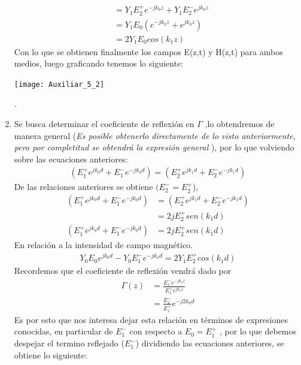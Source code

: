 \documentclass[
  11pt,
  letterpaper,
   addpoints,
   answers
  ]{exam}
\begin{document}
\begin{questions}
\begin{solution}
\begin{enumerate}
\begin{align}
                &= Y_{1}E_{2}^{+}e^{-jk_{0}z} + Y_{1}E_{2}^{-}e^{jk_{0}z}\\
                &= Y_{1}E_{0}(e^{-jk_{0}z} + e^{jk_{0}z} )\\
                &=2Y_{1}E_{0}cos(k_{1}z)
            \end{align}
            Con lo que se obtienen finalmente los campos E(z,t) y H(z,t) para ambos medios, luego graficando tenemos lo siguiente:
            \begin{center}
                \texttt{[image: Auxiliar\_5\_2]}
                \label{fig:mesh25}
            \end{center}.
            \item Se busca determinar el coeficiente de reflexión en $\Gamma$ ,lo obtendremos de manera general (\textit{Es posible obtenerlo directamente de lo visto anteriormente, pero por completitud se obtendrá la expresión general }), por lo que volviendo sobre las ecuaciones anteriores:
            \begin{align}
                ( E_{1}^{+}e^{jk_{0}d} +E_{1}^{-}e^{-jk_{0}d})=( E_{2}^{+}e^{jk_{1}d} +E_{2}^{-}e^{-jk_{1}d})
            \end{align}
            De las relaciones anteriores se obtiene $(E_{2}^{-} = E_{2}^{+}$),
            \begin{align}
                ( E_{1}^{+}e^{jk_{0}d} +E_{1}^{-}e^{-jk_{0}d})&=( E_{2}^{+}e^{jk_{1}d} +E_{2}^{-}e^{-jk_{1}d}) \\&= 2jE_{2}^{+}sen(k_{1}d)\\
                ( E_{1}^{+}e^{jk_{0}d} +E_{1}^{-}e^{-jk_{0}d})&= 2jE_{2}^{+}sen(k_{1}d)
            \end{align}
            En relación a la intensidad de campo magnético.
            \begin{align}
                Y_{0}E_{0}e^{jk_{0}d} - Y_{0}E_{1}^{-}e^{-jk_{o}d}= 2Y_{1}E_{2}^{+}cos(k_{1}d)
            \end{align}
            Recordemos que el coeficiente de reflexión vendrá dado por 
            \begin{align}
                \Gamma(z) &= \frac{E_{1}^{-}e^{-jk_{o}z}}{E_{1}^{+}e^{jk_{o}z}}\\
                          &= \frac{E_{1}^{-}}{E_{1}^{+}} e^{-j2k_{0}d}
            \end{align}
            Es por esto que nos interesa dejar esta relación en términos de expresiones conocidas, en particular de  $E_{1}^{-}$ con respecto a $E_{0}= E_{1}^{+}$ , por lo que debemos despejar el termino reflejado ($E_{1}^{-}$) dividiendo las ecuaciones anteriores, se obtiene lo siguiente:

\end{enumerate}
\end{solution}
\end{questions}
\end{document}
